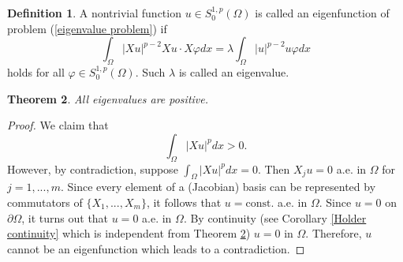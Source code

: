\documentclass[a4paper,12pt,reqno]{amsart}
\renewcommand\eqref[1]{(\ref{#1})} %
\numberwithin{equation}{section}
\theoremstyle{plain}
\newtheorem{thm}{Theorem}[section]
\theoremstyle{definition}
\newtheorem{defn}[thm]{Definition}
\begin{document}
\begin{defn}\label{def:eigenfunction}
A nontrivial function $u \in S_{0}^{1,p}(\Omega)$ is called an eigenfunction of problem \eqref{eigenvalue problem} if
\begin{equation}\label{eigenfunction}
\int_{\Omega}|X u|^{p-2} Xu \cdot X \varphi d x=\lambda \int_{\Omega}|u|^{p-2} u \varphi d x
\end{equation}
holds for all $\varphi\in S_{0}^{1,p}(\Omega)$. Such $\lambda$ is called an eigenvalue.
\end{defn}

\begin{thm}\label{positivity of eigenvalues}
All eigenvalues are   positive.
\end{thm}
\begin{proof}
We claim that
\begin{equation*}
\int_{\Omega}|Xu|^{p}dx>0.
\end{equation*}
However, by contradiction, suppose $\int_{\Omega}|Xu|^{p}dx=0$. Then $X_{j}u=0$ a.e. in $\Omega$ for $j=1,...,m$. Since every element of a (Jacobian) basis can be represented by commutators of $\{X_{1},...,X_{m}\}$, it follows that $u=\text{const.}$ a.e. in $\Omega$. Since $u=0$ on $\partial\Omega$, it turns out that $u=0$ a.e. in $\Omega$. By continuity (see Corollary \ref{Holder continuity} which is independent from Theorem \ref{positivity of eigenvalues}) $u=0$ in $\Omega$. Therefore, $u$ cannot be an eigenfunction which leads to a contradiction. 
\end{proof}
\end{document}
